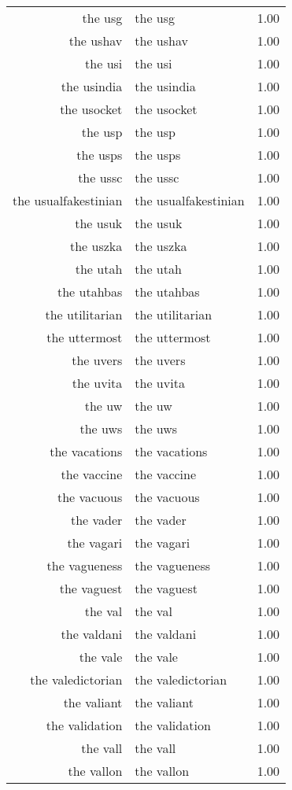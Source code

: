 \begin{table}[ht]
\begin{tabular}{rlr}
  the usg & the usg & 1.00 \\ 
  the ushav & the ushav & 1.00 \\ 
  the usi & the usi & 1.00 \\ 
  the usindia & the usindia & 1.00 \\ 
  the usocket & the usocket & 1.00 \\ 
  the usp & the usp & 1.00 \\ 
  the usps & the usps & 1.00 \\ 
  the ussc & the ussc & 1.00 \\ 
  the usualfakestinian & the usualfakestinian & 1.00 \\ 
  the usuk & the usuk & 1.00 \\ 
  the uszka & the uszka & 1.00 \\ 
  the utah & the utah & 1.00 \\ 
  the utahbas & the utahbas & 1.00 \\ 
  the utilitarian & the utilitarian & 1.00 \\ 
  the uttermost & the uttermost & 1.00 \\ 
  the uvers & the uvers & 1.00 \\ 
  the uvita & the uvita & 1.00 \\ 
  the uw & the uw & 1.00 \\ 
  the uws & the uws & 1.00 \\ 
  the vacations & the vacations & 1.00 \\ 
  the vaccine & the vaccine & 1.00 \\ 
  the vacuous & the vacuous & 1.00 \\ 
  the vader & the vader & 1.00 \\ 
  the vagari & the vagari & 1.00 \\ 
  the vagueness & the vagueness & 1.00 \\ 
  the vaguest & the vaguest & 1.00 \\ 
  the val & the val & 1.00 \\ 
  the valdani & the valdani & 1.00 \\ 
  the vale & the vale & 1.00 \\ 
  the valedictorian & the valedictorian & 1.00 \\ 
  the valiant & the valiant & 1.00 \\ 
  the validation & the validation & 1.00 \\ 
  the vall & the vall & 1.00 \\ 
  the vallon & the vallon & 1.00 \\ 

\end{tabular}
\end{table}
